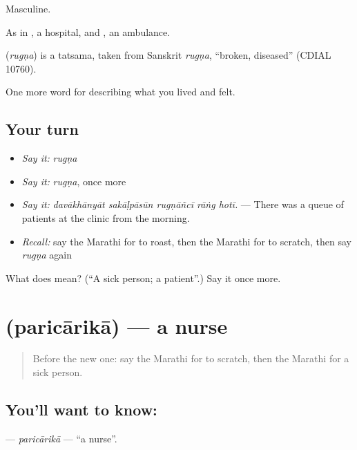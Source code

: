 Masculine.

As in , a hospital, and , an ambulance.

\begin{cousinweb}
\textbf{} (\emph{rugṇa}) is a tatsama, taken from Sanskrit \emph{rugṇa}, \textquotedblleft{}broken, diseased\textquotedblright{} (CDIAL 10760).
\end{cousinweb}

\begin{grammarlens}[title={What you've built}]
One more word for describing what you lived and felt.
\end{grammarlens}

\subsection*{Your turn}
\begin{itemize}
\raggedright
  \item \emph{Say it:} \emph{rugṇa}
  \item \emph{Say it:} \emph{rugṇa}, once more
  \item \emph{Say it:} \emph{davākhānyāt sakāḷpāsūn rugṇāñcī rāṅg hotī.} — There was a queue of patients at the clinic from the morning.
  \item \emph{Recall:} say the Marathi for to roast, then the Marathi for to scratch, then say \emph{rugṇa} again
\end{itemize}

\begin{tcolorbox}[breakable,colback=teal!4,colframe=teal!35!black,title={Before you move on}]
What does  mean? (\textquotedblleft{}A sick person; a patient\textquotedblright{}.) Say it once more.
\end{tcolorbox}
\section[\texorpdfstring{\mr{परिचारिका} (paricārikā)}{परिचारिका (paricārikā)}]{ (paricārikā) — a nurse}

\label{lesson:MR-C488-paricarika}



\begin{quote}
Before the new one: say the Marathi for to scratch, then the Marathi for a sick person.
\end{quote}

\subsection*{You'll want to know: }
\textbf{} — \emph{paricārikā} — \textquotedblleft{}a nurse\textquotedblright{}.

